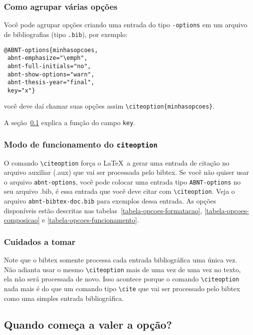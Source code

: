 \documentclass[a4paper]{ltxdoc}
\begin{document}
\subsubsection{Como agrupar várias opções}

Você pode agrupar opções criando uma entrada do tipo {\tt \@ABNT-options}
em um arquivo de bibliografias (tipo {\tt .bib}), por exemplo:
\begin{verbatim}
@ABNT-options{minhasopcoes,
 abnt-emphasize="\emph",
 abnt-full-initials="no",
 abnt-show-options="warn",
 abnt-thesis-year="final",
 key="x"}
\end{verbatim}

você deve daí chamar suas opções assim \verb+\citeoption{minhasopcoes}+.

A seção~\ref{section-quando-vale} explica a função do campo {\tt key}.

\subsubsection{Modo de funcionamento do {\tt citeoption}}

O comando \verb+\citeoption+ força o \LaTeX\ a gerar
uma entrada de citação no arquivo auxiliar (.aux) que vai ser processada
pelo bibtex. Se você não quiser usar o arquivo {\tt abnt-options}, você
pode colocar uma entrada tipo {\tt ABNT-options}
no seu arquivo .bib, é essa entrada que você deve citar com \verb+\citeoption+.
Veja o arquivo
{\tt abnt-bibtex-doc.bib} para exemplos dessa entrada.
As opções disponíveis estão descritas nas
tabelas~\ref{tabela-opcoes-formatacao}, \ref{tabela-opcoes-composicao} e
\ref{tabela-opcoes-funcionamento}.

\subsubsection{Cuidados a tomar}

Note que o bibtex
somente processa cada entrada bibliográfica uma única vez. Não adianta usar
o mesmo \verb+\citeoption+ mais de uma vez de uma vez no texto, ela não
será processada de novo. Isso acontece porque o comando \verb+\citeoption+
nada mais é do que um comando tipo \verb+\cite+ que vai ser processado
pelo bibtex como uma simples entrada bibliográfica.

\subsection{Quando começa a valer a opção?}
\label{section-quando-vale}
\end{document}
